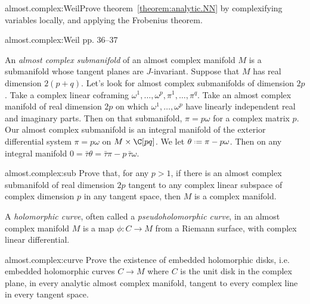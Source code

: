 \begin{problem*}{almost.complex:Weil}Prove theorem~\vref{theorem:analytic.NN} by complexifying variables locally, and applying the Frobenius theorem.\end{problem*}
\begin{answer}{almost.complex:Weil}
\cite{Weil:1958} pp. 36--37
\end{answer}
%
An \emph{almost complex submanifold} of an almost complex manifold \(M\) is a submanifold whose tangent planes are \(J\)-invariant.
Suppose that \(M\) has real dimension \(2(p+q)\).
Let's look for almost complex submanifolds of dimension \(2p\).
Take a complex linear coframing \(\omega^1,\dots,\omega^p,\pi^1,\dots,\pi^q\).
Take an almost complex manifold of real dimension \(2p\) on which \(\omega^1,\dots,\omega^p\) have linearly independent real and imaginary parts.
Then on that submanifold, \(\pi=p\omega\) for a complex matrix \(p\).
Our almost complex submanifold is an integral manifold of the exterior differential system \(\pi=p\omega\) on \(M\times\C[pq]\).
We let \(\theta\defeq\pi-p\omega\).
Then on any integral manifold \(0=\bar\tau\theta=\bar\tau\pi-p \, \bar\tau\omega\).
\begin{problem}{almost.complex:sub}
Prove that, for any \(p>1\), if there is an almost complex submanifold of real dimension \(2p\) tangent to any complex linear subspace of complex dimension \(p\) in any tangent space, then \(M\) is a complex manifold.
\end{problem}
A \emph{holomorphic curve}, often called a \emph{pseudoholomorphic curve}, in an almost complex manifold \(M\) is a map \(\phi \colon C \to M\) from a Riemann surface, with complex linear differential.
\begin{problem}{almost.complex:curve}
Prove the existence of embedded holomorphic disks, i.e. embedded holomorphic curves \(C \to M\) where \(C\) is the unit disk in the complex plane, in every analytic almost complex manifold, tangent to every complex line in every tangent space.
\end{problem}